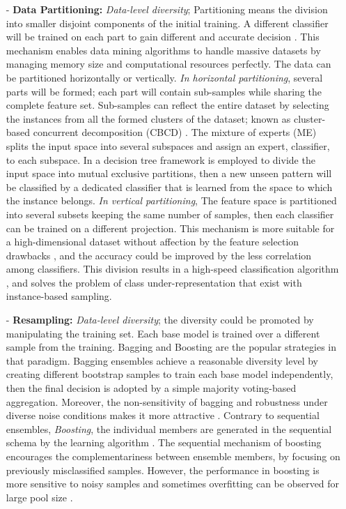 \begin{itemize}
  \item[-]\textbf{Data Partitioning:} \textit{Data-level diversity}; Partitioning means the division into smaller disjoint components of the initial training. A different classifier will be trained on each part to gain different and accurate decision \cite{maimon2005}. This mechanism enables data mining algorithms to handle massive datasets by managing memory size and computational resources perfectly. The data can be partitioned horizontally or vertically. \textit{In horizontal partitioning}, several parts will be formed; each part will contain sub-samples while sharing the complete feature set. Sub-samples can reflect the entire dataset by selecting the instances from all the formed clusters of the dataset; known as cluster-based concurrent decomposition (CBCD) \cite{rokach2005}. The mixture of experts (ME) \cite{nowlan1991}   splits the input space into several subspaces and assign an expert, classifier, to each subspace. In \cite{cohen2007} a decision tree framework is employed to divide the input space into mutual exclusive partitions, then a new unseen pattern will be classified by a dedicated classifier that is learned from the space to which the instance belongs. \textit{In vertical partitioning}, The feature space is partitioned into several subsets keeping the same number of samples, then each classifier can be trained on a different projection. This mechanism is more suitable for a high-dimensional dataset without affection by the feature selection drawbacks \cite{tumer2003}, and the accuracy could be improved by the less correlation among classifiers. This division results in a high-speed classification algorithm \cite{bryll2003}, and solves the problem of class under-representation that exist with instance-based sampling.      
  
  \item[-]\textbf{Resampling:} \textit{Data-level diversity}; the diversity could be promoted by manipulating the training set. Each base model is trained over a different sample from the training. Bagging \cite{breiman1996,skurichina1998} and Boosting \cite{freund1997,freund1999} are the popular strategies in that paradigm. Bagging ensembles achieve a reasonable diversity level by creating different bootstrap samples to train each base model independently, then the final decision is adopted by a simple majority voting-based aggregation. Moreover, the non-sensitivity of bagging and robustness under diverse noise conditions makes it more attractive \cite{dietterich2000}. Contrary to sequential ensembles, \textit{Boosting}, the individual members are generated in the sequential schema by the learning algorithm \cite{freund1997}. The sequential mechanism of boosting encourages the complementariness between ensemble members, by focusing on previously misclassified samples. However, the performance in boosting is more sensitive to noisy samples \cite{dietterich2000,caruana2006} and sometimes overfitting can be observed for large pool size \cite{ratsch2001}. 
  

\end{itemize}
